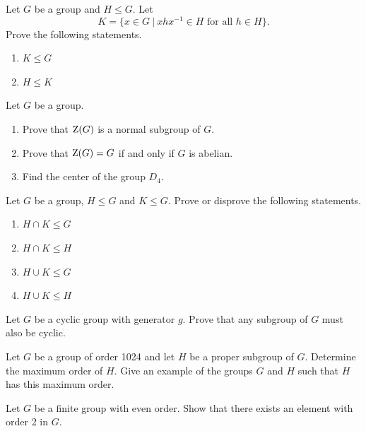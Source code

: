 \begin{problem}
    Let $G$ be a group and $H \leq G$. Let
    \[
        K = \{x \in G \ | \ xhx^{-1} \in H \text{ for all } h \in H \}.
    \]
    Prove the following statements.
    \begin{enumerate}[label=(\alph*)]
        \item $K \leq G$
        \item $H \leq K$
    \end{enumerate}
\end{problem}

\begin{problem}\label{problem-center-of-G}
    Let $G$ be a group.
    \begin{enumerate}[label=(\alph*)]
        \item Prove that $\mathrm{Z}(G)$ is a normal subgroup of $G$.
        \item Prove that $\mathrm{Z}(G) = G$ if and only if $G$ is abelian.
        \item Find the center of the group $D_4$.
    \end{enumerate}
\end{problem}

\begin{problem}\label{problem-intersection-of-subgroups}
    Let $G$ be a group, $H \leq G$ and $K \leq G$. Prove or disprove the following statements.
    \begin{enumerate}[label=(\alph*)]
        \item $H \cap K \leq G$
        \item $H \cap K \leq H$
        \item $H \cup K \leq G$
        \item $H \cup K \leq H$
    \end{enumerate}
\end{problem}

\begin{problem}\label{problem-subgroup-of-cyclic-group-is-cyclic}
    Let $G$ be a cyclic group with generator $g$. Prove that any subgroup of $G$ must also be cyclic.
\end{problem}

\begin{problem}
    Let $G$ be a group of order 1024 and let $H$ be a proper subgroup of $G$. Determine the maximum order of $H$. Give an example of the groups $G$ and $H$ such that $H$ has this maximum order.
\end{problem}

\begin{problem}
    Let $G$ be a finite group with even order. Show that there exists an element with order 2 in $G$.
\end{problem}

